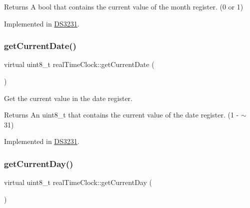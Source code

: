 \begin{DoxyReturn}{Returns}
A bool that contains the current value of the month register. (0 or 1) 
\end{DoxyReturn}


Implemented in \mbox{\hyperlink{class_d_s3231_a38dfc1567d3419d5aeecd2062d4121c7}{D\+S3231}}.

\mbox{\label{classreal_time_clock_a910bce5ee911c18bd34a4154953ce2ac}} 
\subsubsection{\texorpdfstring{get\+Current\+Date()}{getCurrentDate()}}
{\footnotesize\ttfamily virtual uint8\+\_\+t real\+Time\+Clock\+::get\+Current\+Date (\begin{DoxyParamCaption}{ }\end{DoxyParamCaption})\hspace{0.3cm}{\ttfamily [pure virtual]}}



Get the current value in the date register. 

\begin{DoxyReturn}{Returns}
An uint8\+\_\+t that contains the current value of the date register. (1 -\/ $\sim$31) 
\end{DoxyReturn}


Implemented in \mbox{\hyperlink{class_d_s3231_a346341a4d3c6615103b33fbff7a12884}{D\+S3231}}.

\mbox{\label{classreal_time_clock_a13b8ebc25275f183a1117402fc9e5e36}} 
\subsubsection{\texorpdfstring{get\+Current\+Day()}{getCurrentDay()}}
{\footnotesize\ttfamily virtual uint8\+\_\+t real\+Time\+Clock\+::get\+Current\+Day (\begin{DoxyParamCaption}{ }\end{DoxyParamCaption})\hspace{0.3cm}{\ttfamily [pure virtual]}}



